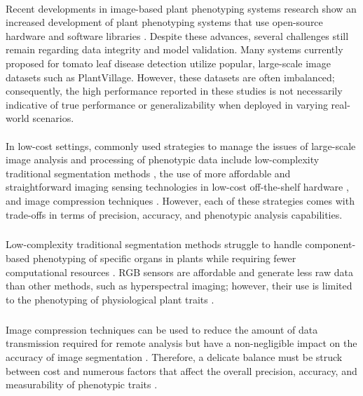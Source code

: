 \paragraph{} 
Recent developments in image-based plant phenotyping systems research show an increased development of plant phenotyping systems that use open-source hardware \cite{liDigitizationVisualizationGreenhouse2015, minerviniImageAnalysisNew2015} and software libraries \cite{fahlgrenVersatilePhenotypingSystem2015}. Despite these advances, several challenges still remain regarding data integrity and model validation. Many systems currently proposed for tomato leaf disease detection utilize popular, large-scale image datasets such as PlantVillage. However, these datasets are often imbalanced; consequently, the high performance reported in these studies is not necessarily indicative of true performance or generalizability when deployed in varying real-world scenarios. 

\paragraph{}
In low-cost settings, commonly used strategies to manage the issues of large-scale image analysis and processing of phenotypic data include low-complexity traditional segmentation methods \cite{minerviniImageAnalysisNew2015}, the use of more affordable and straightforward imaging sensing technologies in low-cost off-the-shelf hardware \cite{tovarRaspberryPiPowered2018a}, and image compression techniques \cite{minerviniApplicationawareImageCompression2013}. However, each of these strategies comes with trade-offs in terms of precision, accuracy, and phenotypic analysis capabilities. 

\subparagraph{}
Low-complexity traditional segmentation methods struggle to handle component-based phenotyping of specific organs in plants while requiring fewer computational resources \cite{choudhurySegmentationTechniquesChallenges2020}. RGB sensors are affordable and generate less raw data than other methods, such as hyperspectral imaging; however, their use is limited to the phenotyping of physiological plant traits \cite{liReviewImagingTechniques2014}. 

\subparagraph{}
Image compression techniques can be used to reduce the amount of data transmission required for remote analysis but have a non-negligible impact on the accuracy of image segmentation \cite{minerviniApplicationawareImageCompression2013}. Therefore, a delicate balance must be struck between cost and numerous factors that affect the overall precision, accuracy, and measurability of phenotypic traits \cite{muller-linowPlantScreenMobile2019}.

